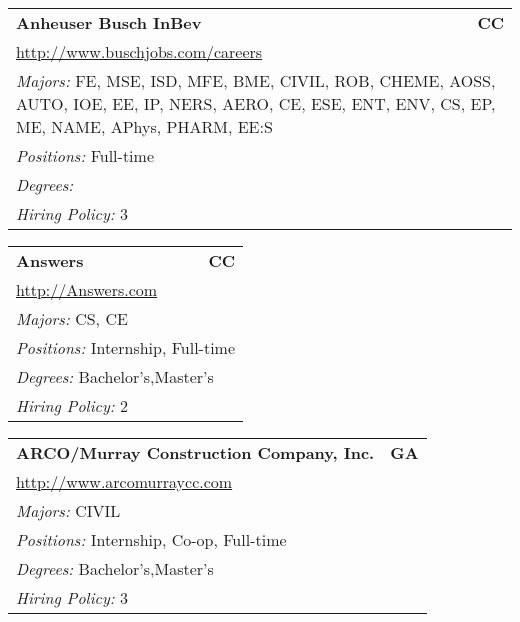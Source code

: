 \documentclass[twoside]{article}
\begin{document}
\begin{center}
\begin{multicols}{3}
\begin{FlushLeft}
\begin{minipage}{\columnwidth}
\end{minipage}
 
\begin{minipage}{\columnwidth}\begin{tabularx}{.95\columnwidth}{Xr}
                 {\Large\bf Anheuser Busch InBev} & {\Large\bf CC}\\
    \multicolumn{2}{p{.95\columnwidth}}{\url{http://www.buschjobs.com/careers}}\\
    \multicolumn{2}{p{.95\columnwidth}}{\emph{Majors:} FE, MSE, ISD, MFE, BME, CIVIL, ROB, CHEME, AOSS, AUTO, IOE, EE, IP, NERS, AERO, CE, ESE, ENT, ENV, CS, EP, ME, NAME, APhys, PHARM, EE:S}\\
    \multicolumn{2}{p{.95\columnwidth}}{\emph{Positions:} Full-time}\\
    \multicolumn{2}{p{.95\columnwidth}}{\emph{Degrees:} }\\
    \multicolumn{2}{p{.95\columnwidth}}{\emph{Hiring Policy:} 3}\\
    \end{tabularx}
    
\end{minipage}
 
\begin{minipage}{\columnwidth}\begin{tabularx}{.95\columnwidth}{Xr}
                 {\Large\bf Answers} & {\Large\bf CC}\\
    \multicolumn{2}{p{.95\columnwidth}}{\url{http://Answers.com}}\\
    \multicolumn{2}{p{.95\columnwidth}}{\emph{Majors:} CS, CE}\\
    \multicolumn{2}{p{.95\columnwidth}}{\emph{Positions:} Internship, Full-time}\\
    \multicolumn{2}{p{.95\columnwidth}}{\emph{Degrees:} Bachelor's,Master's}\\
    \multicolumn{2}{p{.95\columnwidth}}{\emph{Hiring Policy:} 2}\\
    \end{tabularx}
    
\end{minipage}
 
\begin{minipage}{\columnwidth}\begin{tabularx}{.95\columnwidth}{Xr}
                 {\Large\bf ARCO/Murray Construction Company, Inc.} & {\Large\bf GA}\\
    \multicolumn{2}{p{.95\columnwidth}}{\url{http://www.arcomurraycc.com}}\\
    \multicolumn{2}{p{.95\columnwidth}}{\emph{Majors:} CIVIL}\\
    \multicolumn{2}{p{.95\columnwidth}}{\emph{Positions:} Internship, Co-op, Full-time}\\
    \multicolumn{2}{p{.95\columnwidth}}{\emph{Degrees:} Bachelor's,Master's}\\
    \multicolumn{2}{p{.95\columnwidth}}{\emph{Hiring Policy:} 3}\\
    \end{tabularx}
    

\end{minipage}
\end{FlushLeft}
\end{multicols}
\end{center}
\end{document}
